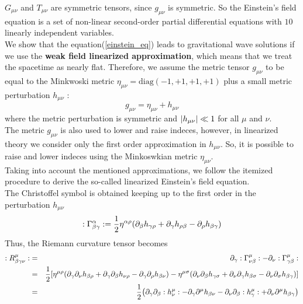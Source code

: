 $G_{\mu \nu}$ and $T_{\mu \nu}$ are symmetric tensors, since $g_{\mu \nu}$ is symmetric.
So the Einstein's field equation is a set of non-linear second-order partial differential equations with $10$ linearly independent variables. \\
We show that the equation(\ref{einstein_eq}) leads to gravitational wave solutions if we use the \textbf{weak field linearized approximation}, which means that we treat the spacetime as nearly flat. 
Therefore, we assume the metric tensor $g_{\mu \nu}$ to be equal to the Minkwoski metric $\eta_{\mu \nu}=\text{diag}(-1,+1,+1,+1)$ plus a small metric perturbation $h_{\mu \nu}$ :
\begin{equation}
\label{metric}
g_{\mu \nu} = \eta_{\mu \nu} + h_{\mu \nu}
\end{equation}
where the metric perturbation is symmetric and $\abs{h_{\mu \nu}}\ll 1$ for all $\mu$ and $\nu$. \\
The metric $g_{\mu \nu}$ is also used to lower and raise indeces, however, in linearized theory we consider only the first order approximation in $h_{\mu \nu}$. So, it is possible to raise and lower indeces using the Minkoswkian metric $\eta_{\mu \nu}$.\\ %
Taking into account the mentioned approximations, we follow the itemized procedure to derive the so-called linearized Einstein's field equation.\\
The Christoffel symbol is obtained keeping up to the first order in the perturbation $h_{\mu \nu}$
\[
:\Gamma ^\alpha _{\beta \gamma}: = 
\dfrac{1}{2} \eta^{\alpha \rho}
\qty(
\partial_\beta h_{\gamma \rho } 
+
 \partial_\gamma h_{\rho \beta}
-
\partial_\rho h _{\beta \gamma}
) 
\]
Thus, the Riemann curvature tensor becomes 
\setlength{\jot}{10pt}
\begin{eqnarray}
:R^\mu _{\beta \gamma \de }: &=&  \notag
\partial_\gamma :\Gamma ^\mu _{\de \beta}: -
\partial_\de :\Gamma ^\mu _{\gamma \beta}: 
\\ \notag
&=& 
\dfrac{1}{2} 
\qty[
\eta^{\mu \rho} 
\qty(
\partial_\gamma \partial_\de h_{\beta \rho} + %
\partial_\gamma \partial_\beta h_{\de \rho} -
\partial_\gamma \partial_\rho h_{\beta \de}
)
-
\eta^{\mu \sigma} 
\qty(
\partial_\de \partial_\beta h_{\gamma \sigma} +
\partial_\de \partial_\gamma h_{\beta \sigma} - %
\partial_\de \partial_\sigma h_{\beta \gamma}
)
]
\\ 
&=&
\label{reimann_curvature_tensor_first_order}
\dfrac{1}{2} \qty(
\partial_\gamma \partial_\beta :h ^\mu _{\de}: -
\partial_\gamma \partial^\mu h_{\beta \de} -
\partial_\de \partial_\beta :h^\mu _{ \gamma} : +
\partial_\de \partial^\mu h_{\beta \gamma}
)
\end{eqnarray}

